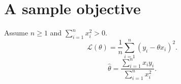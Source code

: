 \documentclass{article}
\begin{document}
\section*{A sample objective}
Assume $n\geq 1$ and $\sum_{i=1}^n x_i^2>0$.
\[
\mathcal{L}(\theta)=\frac{1}{n}\sum_{i=1}^{n}(y_i-\theta x_i)^2.
\]
\[
\widehat{\theta}=
\frac{\sum_{i=1}^{n}x_i y_i}{\sum_{i=1}^{n}x_i^2}.
\]
\end{document}
